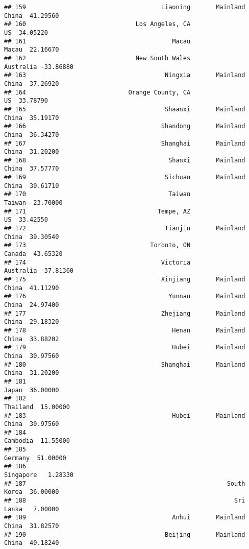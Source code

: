 \documentclass[
]{article}
\begin{document}
\begin{verbatim}
## 159                                     Liaoning       Mainland China  41.29560
## 160                              Los Angeles, CA                   US  34.05220
## 161                                        Macau                Macau  22.16670
## 162                              New South Wales            Australia -33.86880
## 163                                      Ningxia       Mainland China  37.26920
## 164                            Orange County, CA                   US  33.78790
## 165                                      Shaanxi       Mainland China  35.19170
## 166                                     Shandong       Mainland China  36.34270
## 167                                     Shanghai       Mainland China  31.20200
## 168                                       Shanxi       Mainland China  37.57770
## 169                                      Sichuan       Mainland China  30.61710
## 170                                       Taiwan               Taiwan  23.70000
## 171                                    Tempe, AZ                   US  33.42550
## 172                                      Tianjin       Mainland China  39.30540
## 173                                  Toronto, ON               Canada  43.65320
## 174                                     Victoria            Australia -37.81360
## 175                                     Xinjiang       Mainland China  41.11290
## 176                                       Yunnan       Mainland China  24.97400
## 177                                     Zhejiang       Mainland China  29.18320
## 178                                        Henan       Mainland China  33.88202
## 179                                        Hubei       Mainland China  30.97560
## 180                                     Shanghai       Mainland China  31.20200
## 181                                                             Japan  36.00000
## 182                                                          Thailand  15.00000
## 183                                        Hubei       Mainland China  30.97560
## 184                                                          Cambodia  11.55000
## 185                                                           Germany  51.00000
## 186                                                         Singapore   1.28330
## 187                                                       South Korea  36.00000
## 188                                                         Sri Lanka   7.00000
## 189                                        Anhui       Mainland China  31.82570
## 190                                      Beijing       Mainland China  40.18240

\end{verbatim}
\end{document}
